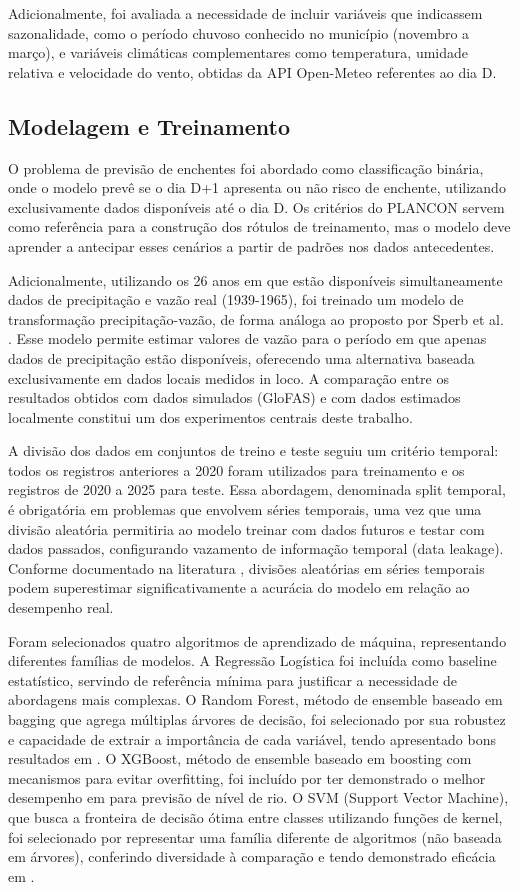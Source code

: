 \documentclass[12pt]{article}
\begin{document}
Adicionalmente, foi avaliada a necessidade de incluir variáveis que indicassem sazonalidade, como o período chuvoso conhecido no município (novembro a março), e variáveis climáticas complementares como temperatura, umidade relativa e velocidade do vento, obtidas da API Open-Meteo referentes ao dia D.

\subsection{Modelagem e Treinamento}

O problema de previsão de enchentes foi abordado como classificação binária, onde o modelo prevê se o dia D+1 apresenta ou não risco de enchente, utilizando exclusivamente dados disponíveis até o dia D. Os critérios do PLANCON servem como referência para a construção dos rótulos de treinamento, mas o modelo deve aprender a antecipar esses cenários a partir de padrões nos dados antecedentes.

Adicionalmente, utilizando os 26 anos em que estão disponíveis simultaneamente dados de precipitação e vazão real (1939-1965), foi treinado um modelo de transformação precipitação-vazão, de forma análoga ao proposto por Sperb et al. \cite{sperb1999}. Esse modelo permite estimar valores de vazão para o período em que apenas dados de precipitação estão disponíveis, oferecendo uma alternativa baseada exclusivamente em dados locais medidos in loco. A comparação entre os resultados obtidos com dados simulados (GloFAS) e com dados estimados localmente constitui um dos experimentos centrais deste trabalho.

A divisão dos dados em conjuntos de treino e teste seguiu um critério temporal: todos os registros anteriores a 2020 foram utilizados para treinamento e os registros de 2020 a 2025 para teste. Essa abordagem, denominada split temporal, é obrigatória em problemas que envolvem séries temporais, uma vez que uma divisão aleatória permitiria ao modelo treinar com dados futuros e testar com dados passados, configurando vazamento de informação temporal (data leakage). Conforme documentado na literatura \cite{geron2017}, divisões aleatórias em séries temporais podem superestimar significativamente a acurácia do modelo em relação ao desempenho real.

Foram selecionados quatro algoritmos de aprendizado de máquina, representando diferentes famílias de modelos. A Regressão Logística foi incluída como baseline estatístico, servindo de referência mínima para justificar a necessidade de abordagens mais complexas. O Random Forest, método de ensemble baseado em bagging que agrega múltiplas árvores de decisão, foi selecionado por sua robustez e capacidade de extrair a importância de cada variável, tendo apresentado bons resultados em \cite{ramos2025}. O XGBoost, método de ensemble baseado em boosting com mecanismos para evitar overfitting, foi incluído por ter demonstrado o melhor desempenho em \cite{parreira2025} para previsão de nível de rio. O SVM (Support Vector Machine), que busca a fronteira de decisão ótima entre classes utilizando funções de kernel, foi selecionado por representar uma família diferente de algoritmos (não baseada em árvores), conferindo diversidade à comparação e tendo demonstrado eficácia em \cite{ramos2025}.
\end{document}
